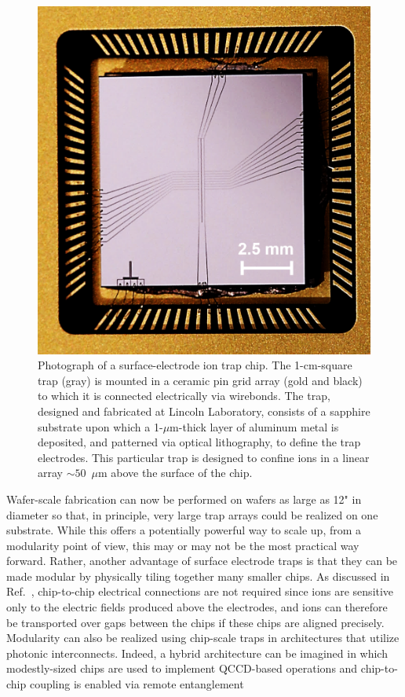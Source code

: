 \documentclass[%
reprint,
 amsmath,amssymb,
]{revtex4-1}
\begin{document}
\begin{figure}
    \centering
    \includegraphics[width=0.8\columnwidth]{Al_trap_v4.png}
    \caption{Photograph of a surface-electrode ion trap chip.  The 1-cm-square trap (gray) is mounted in a ceramic pin grid array (gold and black) to which it is connected electrically via wirebonds.  The trap, designed and fabricated at Lincoln Laboratory, consists of a sapphire substrate upon which a 1-$\mu$m-thick layer of aluminum metal is deposited, and patterned via optical lithography, to define the trap electrodes.  This particular trap is designed to confine ions in a linear array ${\sim}50$~$\mu$m above the surface of the chip.}
    \label{fig:chiptrap}
\end{figure}

Wafer-scale fabrication can now be performed on wafers as large as 12" in diameter so that, in principle, very large trap arrays could be realized on one substrate.  While this offers a potentially powerful way to scale up, from a modularity point of view, this may or may not be the most practical way forward.  Rather, another advantage of surface electrode traps is that they can be made modular by physically tiling together many smaller chips.  As discussed in Ref.~\cite{LekitscheMicrowaveBlueprint2017}, chip-to-chip electrical connections are not required since ions are sensitive only to the electric fields produced above the electrodes, and ions can therefore be transported over gaps between the chips if these chips are aligned precisely.  Modularity can also be realized using chip-scale traps in architectures that utilize photonic interconnects.  Indeed, a hybrid architecture can be imagined in which modestly-sized chips are used to implement QCCD-based operations and chip-to-chip coupling is enabled via remote entanglement \cite{MonroeKimScaling2013}
\end{document}
